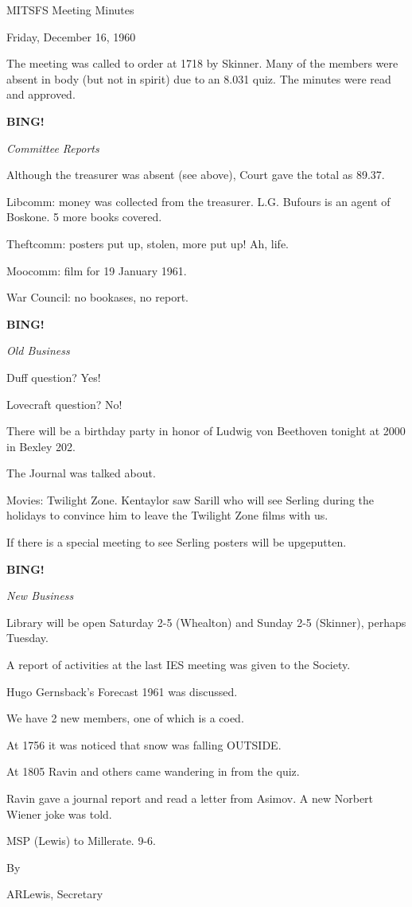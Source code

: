 \documentclass[12pt]{article}
\newcommand{\bing}{{\bf BING!} }
\newcommand{\goto}[1]{\bing \vskip 12pt \centerline{{\em{#1}}}}
\begin{document}
\begin{center}

MITSFS Meeting Minutes

Friday, December 16, 1960

\end{center}
 
\vspace{12pt}

\setlength{\parskip}{6pt}

\noindent
The meeting was called to order at 1718 by Skinner. Many of the members were absent in body (but not in spirit) due to an 8.031 quiz. The minutes were read and approved.

\goto{Committee Reports}

Although the treasurer was absent (see above), Court gave the total as 89.37.

Libcomm: money was collected from the treasurer. L.G. Bufours is an agent of Boskone. 5 more books covered.

Theftcomm: posters put up, stolen, more put up! Ah, life.

Moocomm: film for 19 January 1961.

War Council: no bookases, no report.

\goto{Old Business}

Duff question? Yes!

Lovecraft question? No!

There will be a birthday party in honor of Ludwig von Beethoven tonight at 2000 in Bexley 202.

The Journal was talked about.

Movies: Twilight Zone. Kentaylor saw Sarill who will see Serling during the holidays to convince him to leave the Twilight Zone films with us.

If there is a special meeting to see Serling posters will be upgeputten.

\goto{New Business}

Library will be open Saturday 2-5 (Whealton) and Sunday 2-5 (Skinner), perhaps Tuesday.

A report of activities at the last IES meeting was given to the Society.

Hugo Gernsback's Forecast 1961 was discussed.

We have 2 new members, one of which is a coed.

At 1756 it was noticed that snow was falling OUTSIDE.

At 1805 Ravin and others came wandering in from the quiz.

Ravin gave a journal report and read a letter from Asimov. A new Norbert Wiener joke was told.

MSP (Lewis) to Millerate. 9-6.

\vspace{12pt}

\centerline{By}
\centerline{ARLewis, Secretary}
\end{document}
